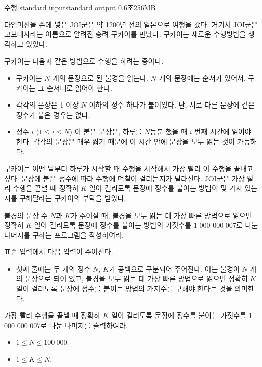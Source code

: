 \begin{problem}{수행}
	{standard input}{standard output}
	{0.6초}{256MB}{}
	
	
	타임머신을 손에 넣은 JOI군은 약 1200년 전의 일본으로 여행을 갔다. 거기서 JOI군은 고보대사라는 이름으로 알려진 승려 구카이를 만났다. 구카이는 새로운 수행방법을 생각하고 있었다.
	
	구카이는 다음과 같은 방법으로 수행을 하려는 중이다.
	
	\begin{itemize}
		\item 구카이는 $N$ 개의 문장으로 된 불경을 읽는다. $N$ 개의 문장에는 순서가 있어서, 구카이는 그 순서대로 읽어야 한다.
		\item 각각의 문장은 1 이상 $N$ 이하의 정수 하나가 붙어있다. 단, 서로 다른 문장에 같은 정수가 붙은 경우는 없다.
		\item 정수 $i$ ($1 \le i \le N$) 이 붙은 문장은, 하루를 $N$등분 했을 때 $i$ 번째 시간에 읽어야 한다. 각각의 문장은 매우 짧기 때문에 이 시간 안에 문장을 모두 읽는 것이 가능하다.
	\end{itemize}

	구카이는 어떤 날부터 하루가 시작할 때 수행을 시작해서 가장 빨리 이 수행을 끝내고 싶다. 문장에 붙은 정수에 따라 수행에 며칠이 걸리는지가 달라진다. JOI군은 가장 빨리 수행을 끝낼 때 정확히 $K$ 일이 걸리도록 문장에 정수를 붙이는 방법이 몇 가지 있는지를 구해달라는 구카이의 부탁을 받았다.
	
	불경의 문장 수 $N$과 $K$가 주어질 때, 불경을 모두 읽는 데 가장 빠른 방법으로 읽으면 정확히 $K$ 일이 걸리도록 문장에 정수를 붙이는 방법의 가짓수를 1 000 000 007로 나눈 나머지를 구하는 프로그램을 작성하여라.
	
	
	\InputFile
	
	표준 입력에서 다음 입력이 주어진다.
	
	\begin{itemize}
		\item 첫째 줄에는 두 개의 정수 $N$, $K$가 공백으로 구분되어 주어진다. 이는 불경이 $N$ 개의 문장으로 되어 있고,  불경을 모두 읽는 데 가장 빠른 방법으로 읽으면 정확히 $K$ 일이 걸리도록 문장에 정수를 붙이는 방법의 가지수를 구해야 한다는 것을 의미한다.
	\end{itemize}
		
	\OutputFile
	
	가장 빨리 수행을 끝낼 때 정확히 $K$ 일이 걸리도록 문장에 정수를 붙이는 가짓수를 1 000 000 007로 나눈 나머지를 출력하여라.
	
	\Constraints
	
	\begin{itemize}
		\item $1 \le N \le 100\ 000$.
		\item $1 \le K \le N$.
	\end{itemize}
	

\end{problem}
